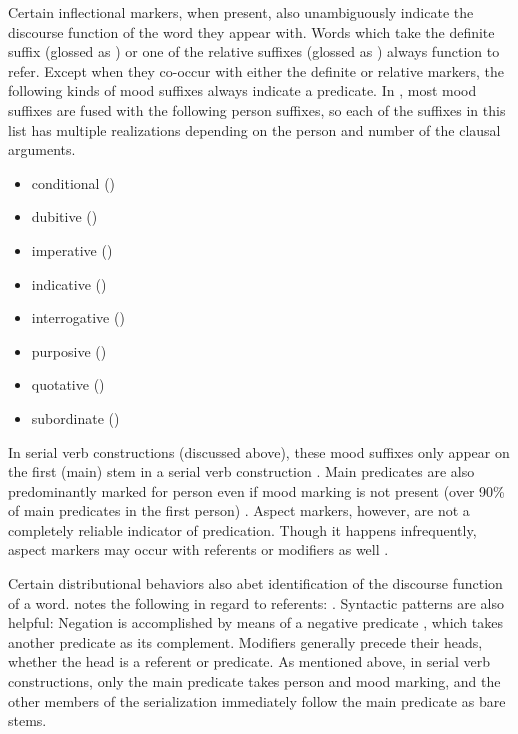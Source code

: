 Certain inflectional markers, when present, also unambiguously indicate the discourse function of the word they appear with. Words which take the definite suffix  (glossed as ) or one of the relative suffixes (glossed as ) always function to refer. Except when they co-occur with either the definite or relative markers, the following kinds of mood suffixes always indicate a predicate. In , most mood suffixes are fused with the following person suffixes, so each of the suffixes in this list has multiple realizations depending on the person and number of the clausal arguments.

\begin{itemize}
  \singlespacing
  \item conditional ()
  \item dubitive ()
  \item imperative ()
  \item indicative ()
  \item interrogative ()
  \item purposive ()
  \item quotative ()
  \item subordinate ()
\end{itemize}

\noindent In serial verb constructions (discussed above), these mood suffixes only appear on the first (main) stem in a serial verb construction \parencite[42]{Nakayama2001}. Main predicates are also predominantly marked for person even if mood marking is not present (over 90\% of main predicates in the first person) \parencite[29]{Nakayama2001}. Aspect markers, however, are not a completely reliable indicator of predication. Though it happens infrequently, aspect markers may occur with referents or modifiers as well \parencite[47--50]{Nakayama2001}.

Certain distributional behaviors also abet identification of the discourse function of a word. \citeauthor{Nakayama2001} notes the following in regard to referents: . Syntactic patterns are also helpful: Negation is accomplished by means of a negative predicate , which takes another predicate as its complement. Modifiers generally precede their heads, whether the head is a referent or predicate. As mentioned above, in serial verb constructions, only the main predicate takes person and mood marking, and the other members of the serialization immediately follow the main predicate as bare stems.

